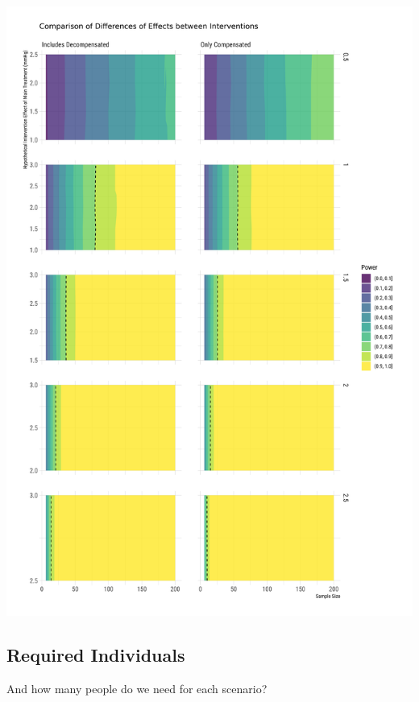 \documentclass[
]{article}
\begin{document}
\includegraphics{figures/unnamed-chunk-74-1.png}

\hypertarget{required-individuals-1}{%
\subsection{Required Individuals}\label{required-individuals-1}}

And how many people do we need for each scenario?
\end{document}
